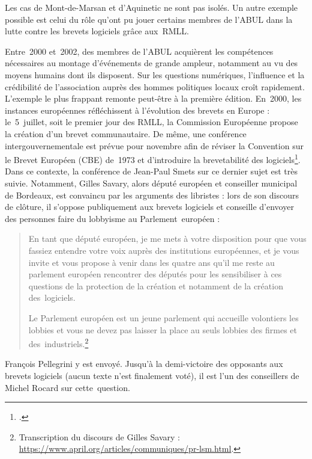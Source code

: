 \documentclass{FramateX}
\begin{document}
\begin{refsection}
Les cas de Mont-de-Marsan et d'Aquinetic ne sont pas isolés. Un autre
exemple possible est celui du rôle qu'ont pu jouer certains membres de
l'ABUL dans la lutte contre les brevets logiciels grâce aux~RMLL.

Entre~2000 et~2002, des membres de l'ABUL acquièrent les compétences
nécessaires au montage d'événements de grande ampleur, notamment au vu
des moyens humains dont ils disposent. Sur les questions numériques,
l'influence et la crédibilité de l'association auprès des hommes
politiques locaux croît rapidement. L'exemple le plus frappant remonte
peut-être à la première édition. En~2000, les instances européennes
réfléchissent à l'évolution des brevets en Europe : le~5~juillet, soit
le premier jour des RMLL, la Commission Européenne propose la création
d'un brevet communautaire. De même, une conférence intergouvernementale
est prévue pour novembre afin de réviser la Convention sur le Brevet
Européen (CBE) de~1973 et d'introduire la brevetabilité des
logiciels\footnote{\cite{billetbrevets2000}.}. Dans ce contexte, la conférence de Jean-Paul Smets sur ce
dernier sujet est très suivie. Notamment, Gilles Savary, alors député
européen et conseiller municipal de Bordeaux, est convaincu par les
arguments des libristes : lors de son discours de clôture, il s'oppose
publiquement aux brevets logiciels et conseille d'envoyer des personnes
faire du lobbyisme au Parlement~européen :

\begin{quote}
En tant que député européen, je me mets à votre disposition pour que
vous fassiez entendre votre voix auprès des institutions européennes,
et je vous invite et vous propose à venir dans les quatre ans qu'il me
reste au parlement européen rencontrer des députés pour les
sensibiliser à ces questions de la protection de la création et
notamment de la création des~logiciels.

Le Parlement européen est un jeune parlement qui accueille volontiers
les lobbies et vous ne devez pas laisser la place au seuls lobbies des
firmes et des~industriels.\footnote{Transcription du discours de
Gilles Savary : \url{https://www.april.org/articles/communiques/pr-lsm.html}.}
\end{quote}

François Pellegrini y est envoyé. Jusqu'à la demi-victoire des opposants
aux brevets logiciels (aucun texte n'est finalement voté), il est l'un
des conseillers de Michel Rocard sur cette~question.


\end{refsection}
\end{document}
